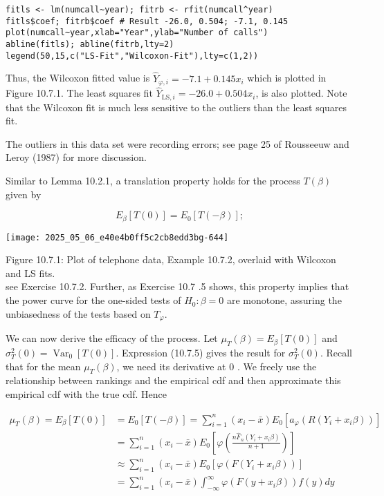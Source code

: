 \begin{verbatim}
fitls <- lm(numcall~year); fitrb <- rfit(numcall^year)
fitls$coef; fitrb$coef # Result -26.0, 0.504; -7.1, 0.145
plot(numcall~year,xlab="Year",ylab="Number of calls")
abline(fitls); abline(fitrb,lty=2)
legend(50,15,c("LS-Fit","Wilcoxon-Fit"),lty=c(1,2))
\end{verbatim}

Thus, the Wilcoxon fitted value is $\widehat{Y}_{\varphi, i}=-7.1+0.145 x_{i}$ which is plotted in Figure 10.7.1. The least squares fit $\widehat{Y}_{\mathrm{LS}, i}=-26.0+0.504 x_{i}$, is also plotted. Note that the Wilcoxon fit is much less sensitive to the outliers than the least squares fit.

The outliers in this data set were recording errors; see page 25 of Rousseeuw and Leroy (1987) for more discussion.

Similar to Lemma 10.2.1, a translation property holds for the process $T(\beta)$ given by


\begin{equation*}
E_{\beta}[T(0)]=E_{0}[T(-\beta)] ; \tag{10.7.10}
\end{equation*}


\begin{center}
\texttt{[image: 2025\_05\_06\_e40e4b0ff5c2cb8edd3bg-644]}
\end{center}

Figure 10.7.1: Plot of telephone data, Example 10.7.2, overlaid with Wilcoxon and LS fits.\\
see Exercise 10.7.2. Further, as Exercise 10.7 .5 shows, this property implies that the power curve for the one-sided tests of $H_{0}: \beta=0$ are monotone, assuring the unbiasedness of the tests based on $T_{\varphi}$.

We can now derive the efficacy of the process. Let $\mu_{T}(\beta)=E_{\beta}[T(0)]$ and $\sigma_{T}^{2}(0)=\operatorname{Var}_{0}[T(0)]$. Expression (10.7.5) gives the result for $\sigma_{T}^{2}(0)$. Recall that for the mean $\mu_{T}(\beta)$, we need its derivative at 0 . We freely use the relationship between rankings and the empirical cdf and then approximate this empirical cdf with the true cdf. Hence


\begin{align*}
\mu_{T}(\beta)=E_{\beta}[T(0)] & =E_{0}[T(-\beta)]=\sum_{i=1}^{n}\left(x_{i}-\bar{x}\right) E_{0}\left[a_{\varphi}\left(R\left(Y_{i}+x_{i} \beta\right)\right)\right] \\
& =\sum_{i=1}^{n}\left(x_{i}-\bar{x}\right) E_{0}\left[\varphi\left(\frac{n \widehat{F}_{n}\left(Y_{i}+x_{i} \beta\right)}{n+1}\right)\right] \\
& \approx \sum_{i=1}^{n}\left(x_{i}-\bar{x}\right) E_{0}\left[\varphi\left(F\left(Y_{i}+x_{i} \beta\right)\right)\right] \\
& =\sum_{i=1}^{n}\left(x_{i}-\bar{x}\right) \int_{-\infty}^{\infty} \varphi\left(F\left(y+x_{i} \beta\right)\right) f(y) d y \tag{10.7.11}
\end{align*}


